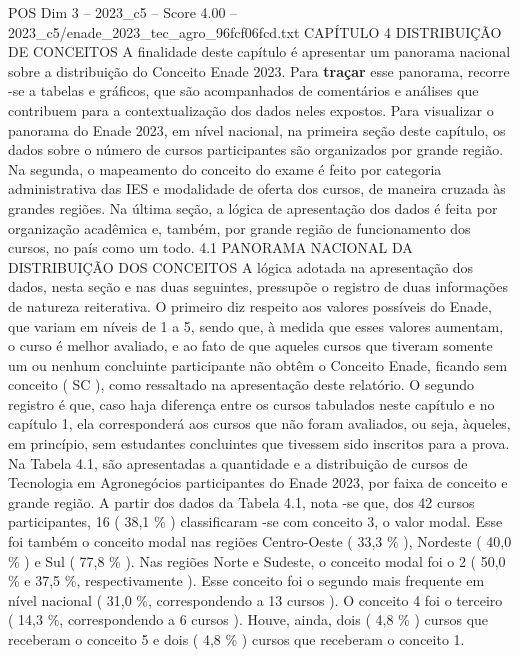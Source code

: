 \begin{textsample}{POS Dim 3 – 2023\_c5 – Score 4.00 – 2023\_c5/enade\_2023\_tec\_agro\_96fcf06fcd.txt}  \label{ex:f3_pos_053}
CAPÍTULO 4 DISTRIBUIÇÃO DE CONCEITOS A finalidade deste capítulo é apresentar um panorama nacional sobre a distribuição do Conceito Enade 2023.
Para \textbf{traçar} esse panorama, recorre -se a tabelas e gráficos, que são acompanhados de comentários e análises que contribuem para a contextualização dos dados neles expostos.
Para visualizar o panorama do Enade 2023, em nível nacional, na primeira seção deste capítulo, os dados sobre o número de cursos participantes são organizados por grande região.
Na segunda, o mapeamento do conceito do exame é feito por categoria administrativa das IES e modalidade de oferta dos cursos, de maneira cruzada às grandes regiões.
Na última seção, a lógica de apresentação dos dados é feita por organização acadêmica e, também, por grande região de funcionamento dos cursos, no país como um todo. 4.1 PANORAMA NACIONAL DA DISTRIBUIÇÃO DOS CONCEITOS A lógica adotada na apresentação dos dados, nesta seção e nas duas seguintes, pressupõe o registro de duas informações de natureza reiterativa.
O primeiro diz respeito aos valores possíveis do Enade, que variam em níveis de 1 a 5, sendo que, à medida que esses valores aumentam, o curso é melhor avaliado, e ao fato de que aqueles cursos que tiveram somente um ou nenhum concluinte participante não obtêm o Conceito Enade, ficando sem conceito ( SC ), como ressaltado na apresentação deste relatório.
O segundo registro é que, caso haja diferença entre os cursos tabulados neste capítulo e no capítulo 1, ela corresponderá aos cursos que não foram avaliados, ou seja, àqueles, em princípio, sem estudantes concluintes que tivessem sido inscritos para a prova.
Na Tabela 4.1, são apresentadas a quantidade e a distribuição de cursos de Tecnologia em Agronegócios participantes do Enade 2023, por faixa de conceito e grande região.
A partir dos dados da Tabela 4.1, nota -se que, dos 42 cursos participantes, 16 ( 38,1 \% ) classificaram -se com conceito 3, o valor modal.
Esse foi também o conceito modal nas regiões Centro-Oeste ( 33,3 \% ), Nordeste ( 40,0 \% ) e Sul ( 77,8 \% ).
Nas regiões Norte e Sudeste, o conceito modal foi o 2 ( 50,0 \% e 37,5 \%, respectivamente ).
Esse conceito foi o segundo mais frequente em nível nacional ( 31,0 \%, correspondendo a 13 cursos ).
O conceito 4 foi o terceiro ( 14,3 \%, correspondendo a 6 cursos ).
Houve, ainda, dois ( 4,8 \% ) cursos que receberam o conceito 5 e dois ( 4,8 \% ) cursos que receberam o conceito 1.

\end{textsample}
